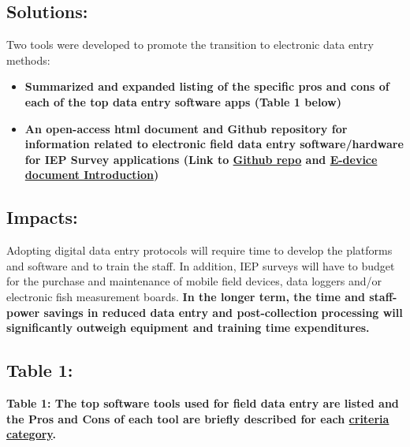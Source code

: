 \documentclass[
]{article}
\begin{document}
\hypertarget{solutions}{%
\subsection*{\texorpdfstring{\textbf{Solutions:}}{Solutions:}}\label{solutions}}

Two tools were developed to promote the transition to electronic data
entry methods:

\begin{itemize}
\item
  \textbf{Summarized and expanded listing of the specific pros and cons
  of each of the top data entry software apps (Table 1 below)}
\item
  \textbf{An open-access html document and Github repository for
  information related to electronic field data entry software/hardware
  for IEP Survey applications (Link to
  \href{https://github.com/InteragencyEcologicalProgram/e-device}{Github
  repo} and
  \href{https://interagencyecologicalprogram.github.io/e-device/}{E-device
  document Introduction})}
\end{itemize}

\hypertarget{impacts}{%
\subsection*{\texorpdfstring{\textbf{Impacts:}}{Impacts:}}\label{impacts}}

Adopting digital data entry protocols will require time to develop the
platforms and software and to train the staff. In addition, IEP surveys
will have to budget for the purchase and maintenance of mobile field
devices, data loggers and/or electronic fish measurement boards.
\textbf{In the longer term, the time and staff-power savings in reduced
data entry and post-collection processing will significantly outweigh
equipment and training time expenditures.}

\hypertarget{table-1}{%
\subsection*{\texorpdfstring{\textbf{Table
1:}}{Table 1:}}\label{table-1}}

\leavevmode{}%
\textbf{Table 1: The top software tools used for field data entry are
listed and the Pros and Cons of each tool are briefly described for each
\href{https://interagencyecologicalprogram.github.io/e-device/software-comparison-criteria.html}{criteria
category}.}
\end{document}

